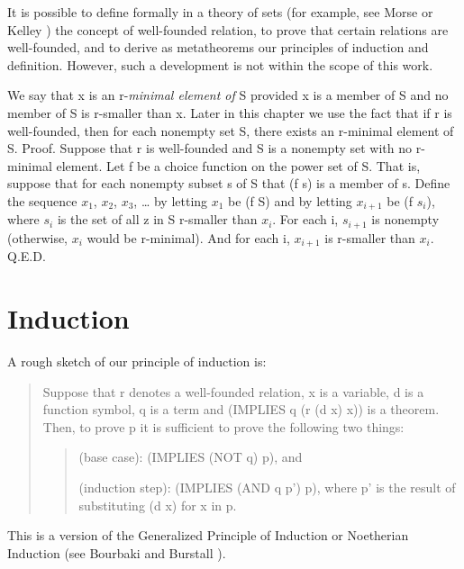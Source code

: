\documentclass[11pt]{book}
\newenvironment{pubcrown}{\begin{quote}}{\end{quote}}
\newcommand{\pubinlineunderline}[1]{\emph{#1}}
\newcommand{\pubdefaulttextsize}{\large}
\begin{document}
It is  possible to define formally in a  theory
of sets (for example, see Morse \cite{MORSE} or Kelley \cite{KELLEY}) the concept of well-founded relation, to
prove that certain relations are well-founded, and to derive
as metatheorems our principles of induction and definition.  However, such
a development is not within the scope of this work.

We say that x is an r-\pubinlineunderline{minimal
element of} S provided x is a member of S and no member of S
is r-smaller than x.  Later in this chapter we  use the fact that if
r is well-founded, then for each nonempty set S, there exists
an r-minimal element of S.  Proof.  Suppose that r is well-founded and S is a nonempty set with no r-minimal element.
Let f be a choice function on the power set of S.  That is, suppose
that for each nonempty subset s of S that (f s) is a member of s.
Define the sequence $x_{1}$, $x_{2}$, $x_{3}$, \ldots{} by
letting $x_{1}$ be (f S) and by letting $x_{i+1}$ be (f $s_{i}$), where $s_{i}$
is the set of all z in S r-smaller than $x_{i}$.  
For each i, $s_{i+1}$ is nonempty (otherwise,
$x_{i}$ would be r-minimal).  And for each i, $x_{i+1}$ is 
r-smaller than $x_{i}$.  Q.E.D.
\section{Induction}
\pubdefaulttextsize
A rough
sketch of our  principle of induction is:
\begin{pubcrown}
Suppose that r denotes a well-founded
relation,  x is a variable, d is a function symbol,
q is a term and (IMPLIES q (r (d x) x)) is a theorem.
Then, to prove p it is sufficient to prove
the following two things:
\begin{pubcrown}
(base case): (IMPLIES (NOT q) p), and

(induction step):  (IMPLIES (AND q p') p),
where p' is the result of substituting (d x) for x in p.
\end{pubcrown}
\end{pubcrown}
This is  a version of the Generalized Principle of Induction or Noetherian
Induction (see Bourbaki \cite{BOURBAKI} and Burstall \cite{BURSTALL}).
\end{document}
